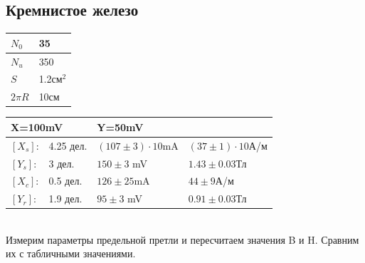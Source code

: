 \documentclass[12pt]{article}
\begin{document}
\subsection{Кремнистое железо}
\begin{minipage}{0.4\textwidth}
\begin{tabular}{|l|l|}
\hline
$N_0$ & 35        \\ \hline
$N_u$ & 350       \\ \hline
$S$   & 1.2см$^2$ \\ \hline
$2\pi R$ & 10см \\ \hline
\end{tabular}
\end{minipage}
\begin{minipage}{0.5\textwidth}
\begin{tabular}{|l|l|l|l|}
\hline
\multicolumn{2}{|l|}{X=100mV} & \multicolumn{2}{l|}{Y=50mV} \\ \hline
$[X_s]$:    & 4.25 дел.    & $(107  \pm 3)\cdot 10 $mA      &    $(37 \pm 1)\cdot 10$А/м  \\ \hline
$[Y_s]$:    & 3 дел.    & $150 \pm 3$ mV        &   $1.43 \pm 0.03$Тл   \\ \hline
$[X_c]$:    & 0.5 дел.  &    $126 \pm 25$mA                  &   $44 \pm 9$А/м   \\ \hline
$[Y_r]$:    & 1.9 дел.  & $95 \pm 3$ mV                     &  $0.91 \pm 0.03$Тл     \\ \hline
\end{tabular}
\end{minipage}\\

Измерим параметры предельной претли и пересчитаем значения B и H. Сравним их с табличными значениями.\\
\end{document}
